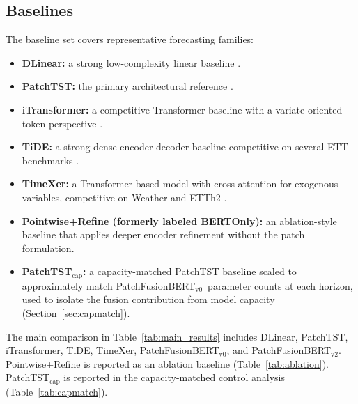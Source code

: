 \documentclass{ieeeaccess}
\newcommand{\modelvzero}{PatchFusionBERT$_{\text{v0}}$\xspace}
\newcommand{\modelvtwo}{PatchFusionBERT$_{\text{v2}}$\xspace}
\newcommand{\patchtst}{PatchTST\xspace}
\newcommand{\dlinear}{DLinear\xspace}
\begin{document}
\subsection{Baselines}
The baseline set covers representative forecasting families:
\begin{itemize}
    \item \textbf{\dlinear:} a strong low-complexity linear baseline
    \cite{zeng2023transformers}.
    \item \textbf{\patchtst:} the primary architectural reference
    \cite{nie2023patchtst}.
    \item \textbf{iTransformer:} a competitive Transformer baseline with a
    variate-oriented token perspective \cite{liu2024itransformer}.
    \item \textbf{TiDE:} a strong dense encoder-decoder baseline competitive on
    several ETT benchmarks \cite{das2023tide}.
    \item \textbf{TimeXer:} a Transformer-based model with cross-attention for
    exogenous variables, competitive on Weather and ETTh2 \cite{wang2024timexer}.
    \item \textbf{Pointwise+Refine (formerly labeled BERTOnly):} an ablation-style baseline that applies deeper encoder
    refinement without the patch formulation.
    \item \textbf{PatchTST$_\text{cap}$:} a capacity-matched PatchTST baseline scaled
    to approximately match \modelvzero\ parameter counts at each horizon, used to
    isolate the fusion contribution from model capacity (Section~\ref{sec:capmatch}).
\end{itemize}
The main comparison in Table~\ref{tab:main_results} includes DLinear, PatchTST,
iTransformer, TiDE, TimeXer, \modelvzero, and \modelvtwo. Pointwise+Refine is reported as
an ablation baseline (Table~\ref{tab:ablation}). PatchTST$_\text{cap}$ is reported
in the capacity-matched control analysis (Table~\ref{tab:capmatch}).
\end{document}
